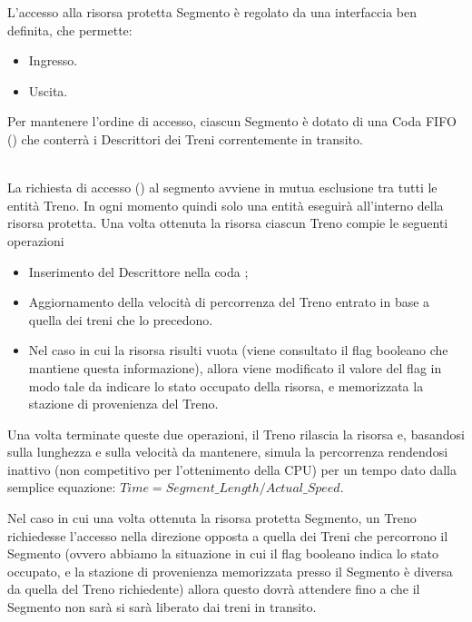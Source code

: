 		L'accesso alla risorsa protetta Segmento è regolato da una interfaccia ben definita, che permette:
			\begin{itemize}
				\item Ingresso.
				\item Uscita.
			\end{itemize}
		Per mantenere l'ordine di accesso, ciascun Segmento è dotato di una Coda FIFO () che conterrà i Descrittori dei Treni correntemente in transito.
		
		\begin{description}
			
			\item {} \\
			
			La richiesta di accesso () al segmento avviene in mutua esclusione tra tutti le entità Treno. In ogni momento quindi solo una entità eseguirà all'interno della risorsa protetta. Una volta ottenuta la risorsa ciascun Treno compie le seguenti operazioni
			 \begin{itemize}
			 	\item Inserimento del Descrittore nella coda ;
			 	\item Aggiornamento della velocità di percorrenza del Treno entrato in base a quella dei treni che lo precedono.
			 	\item Nel caso in cui la risorsa risulti vuota (viene consultato il flag booleano che mantiene questa informazione), allora viene modificato il valore del flag in modo tale da indicare lo stato occupato della risorsa, e memorizzata la stazione di provenienza del Treno.
			\end{itemize}
			Una volta terminate queste due operazioni, il Treno rilascia la risorsa e, basandosi sulla lunghezza e sulla velocità da mantenere, simula la percorrenza rendendosi inattivo (non competitivo per l'ottenimento della CPU) per un tempo dato dalla semplice equazione: $ Time = Segment\_Length / Actual\_Speed $.
			
			Nel caso in cui una volta ottenuta la risorsa protetta Segmento, un Treno richiedesse l'accesso nella direzione opposta a quella dei Treni che percorrono il Segmento (ovvero abbiamo la situazione in cui il flag booleano indica lo stato occupato, e la stazione di provenienza memorizzata presso il Segmento è diversa da quella del Treno richiedente) allora questo dovrà attendere fino a che il Segmento non sarà si sarà liberato dai treni in transito.
			

\end{description}
